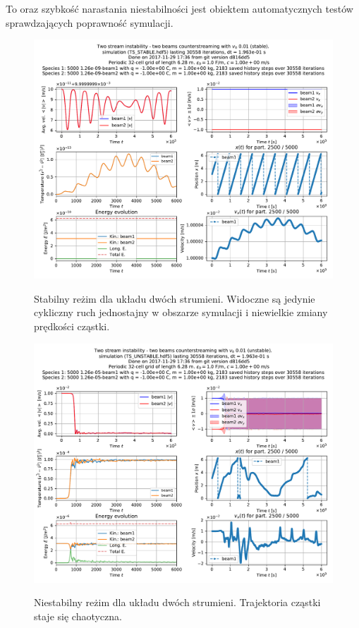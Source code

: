 To oraz szybkość narastania niestabilności jest obiektem automatycznych testów sprawdzających poprawność symulacji.

\begin{figure}[h!]
  \includegraphics[width=\textwidth]{Images/TS_STABLE}
  \label{fig:twostream-stable}
  \caption{Stabilny reżim dla układu dwóch strumieni. Widoczne są jedynie cykliczny ruch jednostajny w obszarze symulacji i niewielkie zmiany prędkości cząstki.}
\end{figure}

\begin{figure}[h!]
  \includegraphics[width=\textwidth]{Images/TS_UNSTABLE}
  \label{fig:twostream-unstable}
  \caption{Niestabilny reżim dla układu dwóch strumieni. Trajektoria cząstki staje się chaotyczna.}
\end{figure}
